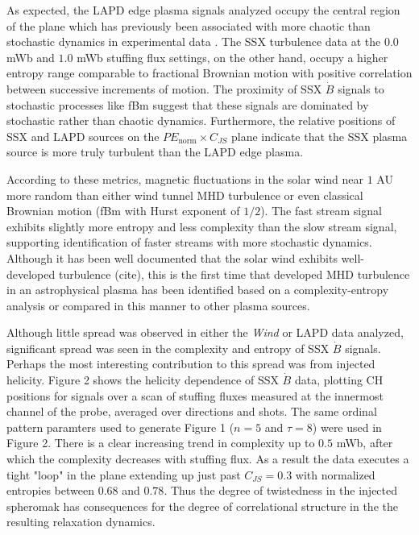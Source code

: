 \documentclass[aps,twocolumn,secnumarabic,nobalancelastpage,amsmath,amssymb,
nofootinbib]{revtex4-1}
\begin{document}
As expected, the LAPD edge plasma signals analyzed occupy the central region of the plane which has previously been associated with more chaotic than stochastic dynamics in experimental data \cite{maggs2013, gekelman2014}. The SSX turbulence data at the $0.0$ mWb and $1.0$ mWb stuffing flux settings, on the other hand, occupy a higher entropy range comparable to fractional Brownian motion with positive correlation between successive increments of motion. The proximity of SSX $\dot{B}$ signals to stochastic processes like fBm suggest that these signals are dominated by stochastic rather than chaotic dynamics. Furthermore, the relative  positions of SSX and LAPD sources on the $PE_{\text{norm}} \times C_{JS}$ plane indicate that the SSX plasma source is more truly turbulent than the LAPD edge plasma. 

According to these metrics, magnetic fluctuations in the solar wind near $1$ AU more random than either wind tunnel MHD turbulence or even classical Brownian motion (fBm with Hurst exponent of $1/2$).  The fast stream signal exhibits slightly more entropy and less complexity than the slow stream signal, supporting identification of faster streams with more stochastic dynamics.  Although it has been well documented that the solar wind exhibits well-developed turbulence (cite), this is the first time that developed MHD turbulence in an astrophysical plasma has been identified based on a complexity-entropy analysis or compared in this manner to other plasma sources.

Although little spread was observed in either the \textit{Wind} or LAPD data analyzed, significant spread was seen in the complexity and entropy of SSX $\dot{B}$ signals. Perhaps the most interesting contribution to this spread was from injected helicity.  Figure 2 shows the helicity dependence of SSX $\dot{B}$ data, plotting CH positions for signals over a scan of stuffing fluxes measured at the innermost channel of the probe, averaged over directions and shots. The same ordinal pattern paramters used to generate Figure 1 ($n=5$ and $\tau=8$) were used in Figure 2. There is a clear increasing trend in complexity up to $0.5$ mWb, after which the complexity decreases with stuffing flux. As a result the data executes a tight "loop" in the plane extending up just past $C_{JS}=0.3$ with normalized entropies between $0.68$ and $0.78$. Thus the degree of twistedness in the injected spheromak has consequences for the degree of correlational structure in the the resulting relaxation dynamics.
\end{document}
